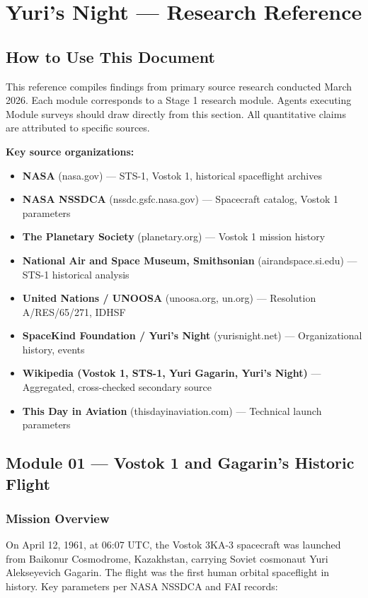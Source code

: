 \documentclass[11pt,letterpaper]{article}
\begin{document}
\section{Yuri's Night — Research Reference}

\subsection{How to Use This Document}

This reference compiles findings from primary source research conducted March 2026. Each module corresponds to a Stage 1 research module. Agents executing Module surveys should draw directly from this section. All quantitative claims are attributed to specific sources.

\textbf{Key source organizations:}
\begin{itemize}[leftmargin=*]
  \item \textbf{NASA} (nasa.gov) — STS-1, Vostok 1, historical spaceflight archives
  \item \textbf{NASA NSSDCA} (nssdc.gsfc.nasa.gov) — Spacecraft catalog, Vostok 1 parameters
  \item \textbf{The Planetary Society} (planetary.org) — Vostok 1 mission history
  \item \textbf{National Air and Space Museum, Smithsonian} (airandspace.si.edu) — STS-1 historical analysis
  \item \textbf{United Nations / UNOOSA} (unoosa.org, un.org) — Resolution A/RES/65/271, IDHSF
  \item \textbf{SpaceKind Foundation / Yuri's Night} (yurisnight.net) — Organizational history, events
  \item \textbf{Wikipedia (Vostok 1, STS-1, Yuri Gagarin, Yuri's Night)} — Aggregated, cross-checked secondary source
  \item \textbf{This Day in Aviation} (thisdayinaviation.com) — Technical launch parameters
\end{itemize}

\subsection{Module 01 — Vostok 1 and Gagarin's Historic Flight}

\subsubsection{Mission Overview}

On April 12, 1961, at 06:07 UTC, the Vostok 3KA-3 spacecraft was launched from Baikonur Cosmodrome, Kazakhstan, carrying Soviet cosmonaut Yuri Alekseyevich Gagarin. The flight was the first human orbital spaceflight in history. Key parameters per NASA NSSDCA and FAI records:
\end{document}
